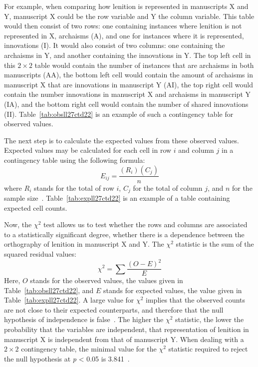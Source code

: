 For example, when comparing how lenition is represented in manuscripts X and Y, manuscript X could be the row variable and Y the column variable. This table would then consist of two rows: one containing instances where lenition is not represented in X, \ie archaisms (A), and one for instances where it is represented, \ie innovations (I).  It would also consist of two columns: one containing the archaisms in Y, and another containing the innovations in Y. The top left cell in this \(2 \times 2\) table would contain the number of instances that are archaisms in both manuscripts (AA), the bottom left cell would contain the amount of archaisms in manuscript X that are innovations in manuscript Y (AI), the top right cell would contain the number innovations in manuscript X and archaisms in manuscript Y (IA), and the bottom right cell would contain the number of shared innovations (II). Table~\ref{tab:obsll27ctd22} is an example of such a contingency table for observed values.

The next step is to calculate the expected values from these observed values. Expected values may be calculated for each cell in row \(i\) and column \(j\) in a contingency table using the following formula:
\[E_{ij}=\frac{(R_i)(C_j)}{n}\]
where \(R_i\) stands for the total of row \(i\), \(C_j\) for the total of column \(j\), and \(n\) for the sample size~\autocite[755--756]{MS_Statistics09}. Table~\ref{tab:expll27ctd22} is an example of a table containing expected cell counts.

Now, the \(\chi^2\) test allows us to test whether the rows and columns are associated to a statistically significant degree, \ie whether there is a dependence between the orthography of lenition in manuscript X and Y. The \(\chi^2\) statistic is the sum of the squared residual values:
\[\chi^2=\sum{\frac{(O-E)^2}{E}}\]
Here, \(O\) stands for the observed values, \eg the values given in Table~\ref{tab:obsll27ctd22}, and \(E\) stands for expected values, \eg the value given in Table~\ref{tab:expll27ctd22}. A large value for \(\chi^2\) implies that the observed counts are not close to their expected counterparts, and therefore that the null hypothesis of independence is false~\autocite[756--757]{MS_Statistics09}. The higher the \(\chi^2\) statistic, the lower the probability that the variables are independent, \eg that representation of lenition in manuscript X is independent from that of manuscript Y. When dealing with a \(2 \times 2\) contingency table, the minimal value for the \(\chi^2\) statistic required to reject the null hypothesis at \textit{p} < 0.05 is 3.841~\autocite[798]{MS_Statistics09}.

